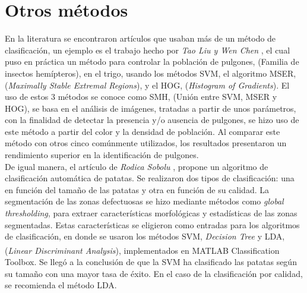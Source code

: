 \section{Otros métodos}
	En la literatura se encontraron artículos que usaban más de un método de clasificación, un ejemplo es el trabajo hecho por \textit{Tao Liu y Wen Chen} \cite{LIU201682}, el cual puso en práctica un método para controlar la población de pulgones, (Familia de insectos hemípteros), en el trigo, usando los métodos SVM, el algoritmo MSER, (\textit{Maximally Stable Extremal Regions}), y el HOG, (\textit{Histogram of Gradients}). El uso de estos 3 métodos se conoce como SMH, (Unión entre SVM, MSER y HOG), se basa en el análisis de imágenes, tratadas a partir de unos parámetros, con la finalidad de detectar la presencia y/o ausencia de pulgones, se hizo uso de este método a partir del color y la densidad de población. Al comparar este método con otros cinco comúnmente utilizados, los resultados presentaron un rendimiento superior en la identificación de pulgones. \\
	
	De igual manera, el artículo de \textit{Rodica Sobolu} \cite{sobolu2020automatic}, propone un algoritmo de clasificación automática de patatas. Se realizaron dos tipos de clasificación: una en función del tamaño de las patatas y otra en función de su calidad. La segmentación de las zonas defectuosas se hizo mediante métodos como \textit{global thresholding}, para extraer características morfológicas y estadísticas de las zonas segmentadas. Estas características se eligieron como entradas para los algoritmos de clasificación, en donde se usaron los métodos SVM, \textit{Decision  Tree} y LDA, (\textit{Linear Discriminant Analysis}), implementados en MATLAB\textsuperscript{\textregistered} Classification Toolbox. Se llegó a la conclusión de que la SVM ha clasificado las patatas según su tamaño con una mayor tasa de éxito. En el caso de la clasificación por calidad, se recomienda el método LDA.\\
	
